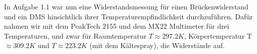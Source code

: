 \documentclass[parskip=half]{report}
\begin{document}
In Aufgabe 1.1 war nun eine Widerstandsmessung für einen Brückenwiderstand und ein DMS hinsichtlich ihrer Temperaturempfindlichkeit durchzuführen. Dafür nahmen wir mit dem PeakTech 2155 und dem MX22 Multimeter für drei Temperaturen, und zwar für Raumtemperatur $T\approx297.2K$, Körpertemperatur T$\approx309.2K$ und $T\approx223.2K$ (mit dem Kältespray), die Widerstände auf.


	
	
\end{document}
